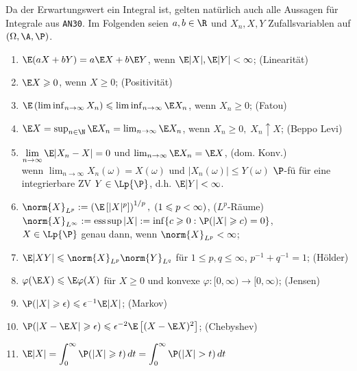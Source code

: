 \documentclass[11pt, a4paper]{article}
\begin{document}
\begin{note} \Theorem
    Da der Erwartungswert ein Integral ist, gelten natürlich auch alle Aussagen für Integrale aus \texttt{AN30}. Im Folgenden seien $a,b\in \R$ und $X_n, X, Y$ Zufallsvariablen auf $(\Omega, \A, \P)$.

    \begin{enumerate}[label=\alph*)]
        \item $\E(aX+bY) = a\E X + b\E Y$, wenn $\E|X|, \E|Y| <\infty$; \hfill (Linearität)
        \item $\E X \geqslant 0$, wenn $X\geqslant 0$; \hfill (Positivität)
        \item $\E\left(\liminf_{n\to\infty} X_n\right) \leqslant \liminf_{n\to\infty} \E X_n$, wenn $X_n \geqslant 0$; \hfill (Fatou)
        \item $\E X = \sup_{n\in\N} \E X_n = \lim_{n\to\infty} \E X_n$, wenn $X_n \geqslant 0, \; X_n \uparrow X$; \hfill (Beppo Levi)
        \item $\displaystyle \lim_{n\to\infty} \E|X_n - X| = 0$ und $\lim_{n\to\infty} \E X_n = \E X$, \hfill (dom. Konv.)\\
        wenn $\lim_{n\to\infty} X_n(\omega) = X(\omega)$ und $|X_n(\omega)| \leqslant Y(\omega)$ $\P$-fü für eine integrierbare ZV $Y \in \Lp{\P}$, d.h. $\E|Y| <\infty$.
        \item $\norm{X}_{L^p} := \left(\E\left[|X|^p\right]\right)^{1/p}, \; (1\leqslant p <\infty)$, \hfill ($L^p$-Räume)\\
        $\norm{X}_{L^\infty} := \operatorname{ess\,sup} |X| := \inf\{c\geqslant 0 : \P(|X|\geqslant c) = 0\}$,\\
        $X \in \Lp{\P}$ genau dann, wenn $\norm{X}_{L^p} <\infty$;
        \item $\E|XY| \leqslant \norm{X}_{L^p} \norm{Y}_{L^q}$ für $1\leqslant p,q\leqslant \infty$, $p^{-1}+q^{-1}=1$; \hfill (Hölder)
        \item $\varphi(\E X) \leqslant \E \varphi(X)$ für $X\geqslant 0$ und konvexe $\varphi: [0,\infty)\to[0,\infty)$; \hfill (Jensen)
        \item $\P(|X|\geqslant \epsilon) \leqslant \epsilon^{-1}\E|X|$; \hfill (Markov)
        \item $\P(|X-\E X|\geqslant \epsilon) \leqslant \epsilon^{-2}\E\left[(X-\E X)^2\right]$; \hfill (Chebyshev)
        \item $\displaystyle \E|X| = \int_0^\infty \P(|X|\geqslant t)\,dt = \int_0^\infty \P(|X|>t)\,dt$
    \end{enumerate}
\end{note}
\end{document}
